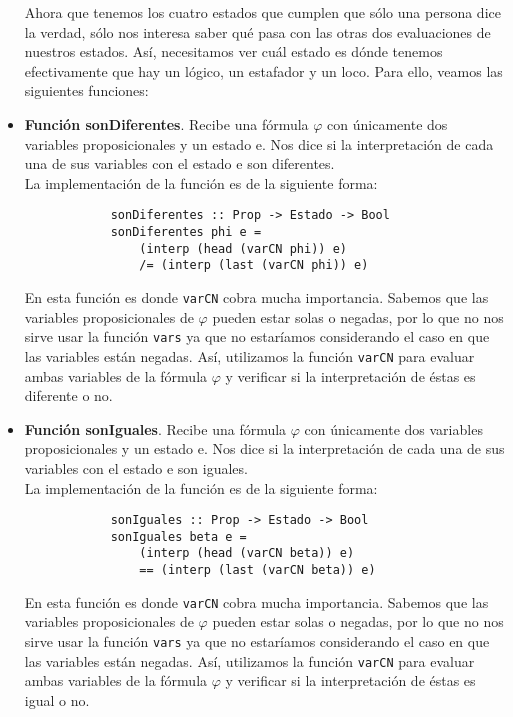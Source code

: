 \documentclass[letterpaper,11pt]{article}
\begin{document}
\begin{itemize}
        Ahora que tenemos los cuatro estados que cumplen que sólo una persona
        dice la verdad, sólo nos interesa saber qué pasa con las otras dos 
        evaluaciones de nuestros estados. Así, necesitamos ver cuál estado 
        es dónde tenemos efectivamente que hay un lógico, un estafador y un
        loco. Para ello, veamos las siguientes funciones:

        \item \textbf{Función sonDiferentes}. Recibe una fórmula $\varphi$ con
        únicamente dos variables proposicionales y un estado e. Nos dice si 
        la interpretación de cada una de sus variables con el estado e son 
        diferentes. \\
        La implementación de la función es de la siguiente forma: 
        \begin{lstlisting}
            sonDiferentes :: Prop -> Estado -> Bool
            sonDiferentes phi e = 
                (interp (head (varCN phi)) e) 
                /= (interp (last (varCN phi)) e)
        \end{lstlisting}

        En esta función es donde \texttt{varCN} cobra mucha importancia. 
        Sabemos que las variables proposicionales de $\varphi$ pueden estar 
        solas o negadas, por lo que no nos sirve usar la función \texttt{vars}
        ya que no estaríamos considerando el caso en que las variables están 
        negadas. Así, utilizamos la función \texttt{varCN} para evaluar ambas 
        variables de la fórmula $\varphi$ y verificar si la interpretación de 
        éstas es diferente o no.

        \item \textbf{Función sonIguales}. Recibe una fórmula $\varphi$ con 
        únicamente dos variables proposicionales y un estado e. Nos dice si 
        la interpretación de cada una de sus variables con el estado e son 
        iguales. \\
        La implementación de la función es de la siguiente forma:
        \begin{lstlisting}
            sonIguales :: Prop -> Estado -> Bool
            sonIguales beta e = 
                (interp (head (varCN beta)) e) 
                == (interp (last (varCN beta)) e)
        \end{lstlisting}

        En esta función es donde \texttt{varCN} cobra mucha importancia. 
        Sabemos que las variables proposicionales de $\varphi$ pueden estar 
        solas o negadas, por lo que no nos sirve usar la función \texttt{vars}
        ya que no estaríamos considerando el caso en que las variables están 
        negadas. Así, utilizamos la función \texttt{varCN} para evaluar ambas 
        variables de la fórmula $\varphi$ y verificar si la interpretación de 
        éstas es igual o no.


\end{itemize}
\end{document}
